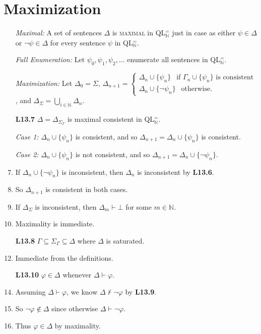 \documentclass[a4paper, 11pt]{article} %
\def\proves{\ensuremath{\vdash}}
\def\nproves{\ensuremath{\nvdash}}
\newcommand{\set}[1]{\lbrace#1\rbrace} %
\newcommand{\N}{\mathbb{N}}
\def\metaA{\ensuremath{\varphi}}
\def\metaB{\ensuremath{\psi}}
\begin{document}
\section*{Maximization}

\begin{enumerate}
  \item[\it Maximal:] A set of sentences $\Delta$ is \textsc{maximal} in QL$^=_{\N}$ just in case as either $\metaB\in\Delta$ or $\neg\metaB\in\Delta$ for every sentence $\metaB$ in QL$^=_{\N}$.
  \item[\it Full Enumeration:] Let $\metaB_0,\metaB_1,\metaB_2,\ldots$ enumerate all sentences in QL$^=_{\N}$.
  \item[\it Maximization:] Let $\Delta_0 = \Sigma$, 
    $\Delta_{n+1} =
      \begin{cases}
        \Delta_n\cup\set{\metaB_n} ~~\text{ if } \Gamma_n\cup\set{\metaB_n} \text{ is consistent}\\
        \Delta_n\cup\set{\neg\metaB_n} ~~\text{ otherwise}.
      \end{cases}$,
    and $\Delta_\Sigma = \bigcup_{i\in\N}\Delta_n$. 
  \item[\bf L13.7] $\Delta=\Delta_{\Sigma_\Gamma}$ is maximal consistent in QL$^=_{\N}$.
  \item[\it Case 1:] $\Delta_n\cup\set{\metaB_n}$ is consistent, and so $\Delta_{n+1}=\Delta_n\cup\set{\metaB_n}$ is consistent. 
  \item[\it Case 2:] $\Delta_n\cup\set{\metaB_n}$ is not consistent, and so $\Delta_{n+1}=\Delta_n\cup\set{\neg\metaB_n}$.
  \item If $\Delta_n\cup\set{\neg\metaB_n}$ is inconsistent, then $\Delta_n$ is inconsistent by \textbf{L13.6}. 
  \item So $\Delta_{n+1}$ is consistent in both cases. 
  \item If $\Delta_\Sigma$ is inconsistent, then $\Delta_m\proves\bot$ for some $m\in\N$.
  \item Maximality is immediate.
  \item[\bf L13.8] $\Gamma\subseteq\Sigma_\Gamma\subseteq\Delta$ where $\Delta$ is saturated.
    \setcounter{enumi}{0}
  \item Immediate from the definitions.
  \item[\bf L13.10] $\metaA\in\Delta$ whenever $\Delta\proves\metaA$.
    \setcounter{enumi}{0}
  \item Assuming $\Delta\proves\metaA$, we know $\Delta\nproves\neg\metaA$ by \textbf{L13.9}.
  \item So $\neg\metaA\notin\Delta$ since otherwise $\Delta\proves\neg\metaA$.
  \item Thus $\metaA\in\Delta$ by maximality. 
\end{enumerate}
\end{document}
